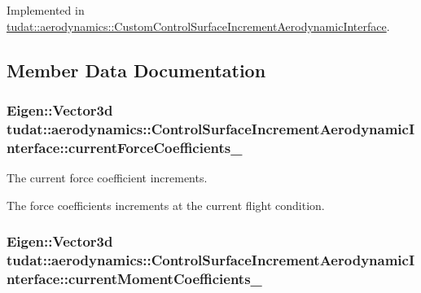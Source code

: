 Implemented in \hyperlink{classtudat_1_1aerodynamics_1_1CustomControlSurfaceIncrementAerodynamicInterface_a8c5c91fb0c3fb66e5b4a599f117a8ddc}{tudat\+::aerodynamics\+::\+Custom\+Control\+Surface\+Increment\+Aerodynamic\+Interface}.



\subsection{Member Data Documentation}
\subsubsection[{\texorpdfstring{current\+Force\+Coefficients\+\_\+}{currentForceCoefficients_}}]{\setlength{\rightskip}{0pt plus 5cm}Eigen\+::\+Vector3d tudat\+::aerodynamics\+::\+Control\+Surface\+Increment\+Aerodynamic\+Interface\+::current\+Force\+Coefficients\+\_\+\hspace{0.3cm}{\ttfamily [protected]}}\hypertarget{classtudat_1_1aerodynamics_1_1ControlSurfaceIncrementAerodynamicInterface_ab7c7dfdd3e7190abac6021345145bc34}{}\label{classtudat_1_1aerodynamics_1_1ControlSurfaceIncrementAerodynamicInterface_ab7c7dfdd3e7190abac6021345145bc34}


The current force coefficient increments. 

The force coefficients increments at the current flight condition. 
\subsubsection[{\texorpdfstring{current\+Moment\+Coefficients\+\_\+}{currentMomentCoefficients_}}]{\setlength{\rightskip}{0pt plus 5cm}Eigen\+::\+Vector3d tudat\+::aerodynamics\+::\+Control\+Surface\+Increment\+Aerodynamic\+Interface\+::current\+Moment\+Coefficients\+\_\+\hspace{0.3cm}{\ttfamily [protected]}}\hypertarget{classtudat_1_1aerodynamics_1_1ControlSurfaceIncrementAerodynamicInterface_a940f44e0431811d8a3c1832aca5f7015}{}\label{classtudat_1_1aerodynamics_1_1ControlSurfaceIncrementAerodynamicInterface_a940f44e0431811d8a3c1832aca5f7015}


